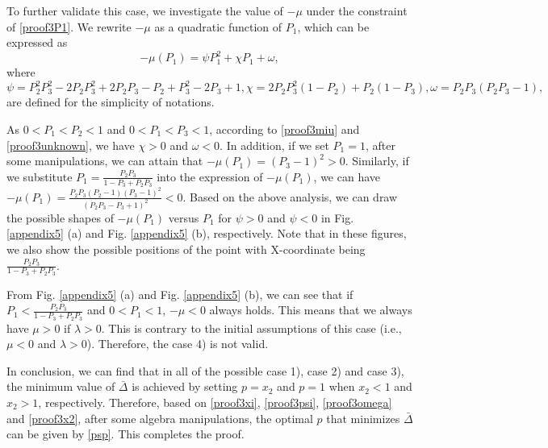 \documentclass{IEEEtran}
\begin{document}
\begin{appendices}
To further validate this case, we investigate the value of $-\mu$ under the constraint of \eqref{proof3P1}. We rewrite $-\mu$ as a quadratic function of $P_{1}$, which can be expressed as 
\begin{equation}
-\mu(P_{1})=\psi P_{1}^2+\chi P_{1}+\omega,
\end{equation}
where
\begin{subequations}
	\begin{equation}
	\psi = P_{2}^2P_{3}^2-2P_{2}P_{3}^2+2P_{2}P_{3}-P_{2}+P_{3}^2-2P_{3}+1,
	\end{equation}
	\begin{equation}\label{proof3miu}
	\chi=2P_{2}P_{3}^2(1-P_{2})+P_{2}(1-P_{3}),
	\end{equation}
	\begin{equation}\label{proof3unknown}
	\omega= P_{2}P_{3}(P_{2}P_{3}-1),
	\end{equation}
\end{subequations}
are defined for the simplicity of notations.



As $0<P_{1}<P_{2}<1$ and $0<P_{1}<P_{3}<1$, according to \eqref{proof3miu} and \eqref{proof3unknown}, we have $\chi>0$ and $\omega<0$. In addition, if we set $P_{1}=1$, after some manipulations, we can attain that $-\mu({P_{1}})=(P_{3}-1)^2>0$. Similarly, if we substitute $P_{1}=\frac{P_{2}P_{3}}{1-P_{3}+P_{2}P_{3}}$ into the expression of $-\mu(P_{1})$, we can have $-\mu (P_{1})=\frac{P_{2}P_{3}(P_{2}-1)(P_{3}-1)^2}{(P_{2}P_{3}-P_{3}+1)^2}<0$. Based on the above analysis, we can draw the possible shapes of $-\mu(P_{1})$ versus $P_{1}$ for $\psi>0$ and $\psi<0$ in Fig. \ref{appendix5} (a) and Fig. \ref{appendix5} (b), respectively. Note that in these figures, we also show the possible positions of the point with X-coordinate being $\frac{P_{2}P_{3}}{1-P_{3}+P_{2}P_{3}}$.

From Fig. \ref{appendix5} (a) and Fig. \ref{appendix5} (b), we can see that if $P_{1}<\frac{P_{2}P_{3}}{1-P_{3}+P_{2}P_{3}}$ and $0<P_{1}<1$,  $-\mu<0$ always holds. This means that we always have $\mu>0$ if $\lambda>0$. This is contrary to the initial assumptions of this case (i.e., $\mu<0$ and $\lambda>0$). Therefore, the case 4) is not valid.

In conclusion, we can find that in all of the possible case 1), case 2) and case 3), the minimum value of $\bar\Delta$ is achieved by setting $p=x_{2}$ and $p=1$ when $x_{2}<1$ and $x_{2}>1$, respectively. Therefore, based on \eqref{proof3xi}, \eqref{proof3psi}, \eqref{proof3omega} and \eqref{proof3x2}, after some algebra manipulations, the optimal $p$ that minimizes $\bar\Delta$ can be given by \eqref{psp}. This completes the proof.


\end{appendices}
\end{document}
